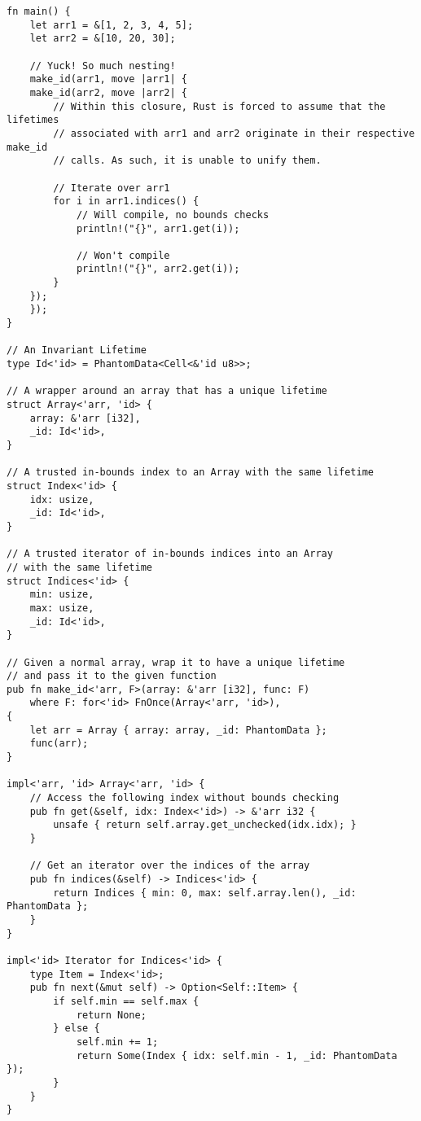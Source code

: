 \begin{verbatim}
fn main() {
    let arr1 = &[1, 2, 3, 4, 5];
    let arr2 = &[10, 20, 30];

    // Yuck! So much nesting!
    make_id(arr1, move |arr1| {
    make_id(arr2, move |arr2| {
        // Within this closure, Rust is forced to assume that the lifetimes
        // associated with arr1 and arr2 originate in their respective make_id
        // calls. As such, it is unable to unify them.

        // Iterate over arr1
        for i in arr1.indices() {
            // Will compile, no bounds checks
            println!("{}", arr1.get(i));

            // Won't compile
            println!("{}", arr2.get(i));
        }
    });
    });
}

// An Invariant Lifetime
type Id<'id> = PhantomData<Cell<&'id u8>>;

// A wrapper around an array that has a unique lifetime
struct Array<'arr, 'id> {
    array: &'arr [i32],
    _id: Id<'id>,
}

// A trusted in-bounds index to an Array with the same lifetime
struct Index<'id> {
    idx: usize,
    _id: Id<'id>,
}

// A trusted iterator of in-bounds indices into an Array
// with the same lifetime
struct Indices<'id> {
    min: usize,
    max: usize,
    _id: Id<'id>,
}

// Given a normal array, wrap it to have a unique lifetime
// and pass it to the given function
pub fn make_id<'arr, F>(array: &'arr [i32], func: F)
    where F: for<'id> FnOnce(Array<'arr, 'id>),
{
    let arr = Array { array: array, _id: PhantomData };
    func(arr);
}

impl<'arr, 'id> Array<'arr, 'id> {
    // Access the following index without bounds checking
    pub fn get(&self, idx: Index<'id>) -> &'arr i32 {
        unsafe { return self.array.get_unchecked(idx.idx); }
    }

    // Get an iterator over the indices of the array
    pub fn indices(&self) -> Indices<'id> {
        return Indices { min: 0, max: self.array.len(), _id: PhantomData };
    }
}

impl<'id> Iterator for Indices<'id> {
    type Item = Index<'id>;
    pub fn next(&mut self) -> Option<Self::Item> {
        if self.min == self.max {
            return None;
        } else {
            self.min += 1;
            return Some(Index { idx: self.min - 1, _id: PhantomData });
        }
    }
}
\end{verbatim}

